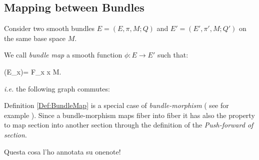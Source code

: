 \documentclass[Main]{subfiles}
\begin{document}
		\subsection{Mapping between Bundles}
			Consider two smooth bundles $E=(E,\pi,M; Q)$ and $E'=(E',\pi',M; Q')$ on the same base space $M$.
			\begin{definition}\label{Def:BundleMap}
				We call \emph{bundle map} a smooth function $\phi: E \rightarrow E'$ such that:
			 	\begin{compactdisplaymath}
			 		\phi(E_{x})= F_{x} \qquad \forall x \in M.
			 	\end{compactdisplaymath}
				\textit{i.e.} the following graph commutes:

				\vspace{-2mm}
				\centering
			\end{definition}
				Definition \ref{Def:BundleMap} is a special case of \emph{bundle-morphism} ( see for example \cite{G.Sardanashvily2013}).
				Since a bundle-morphism maps fiber into fiber it has also the property to map section into another section through the definition of the \emph{Push-forward of section}.
				\ifToninus
				\begin{warning}
					Questa cosa l'ho annotata su onenote!				
				\end{warning}
				
				\fi
\end{document}
